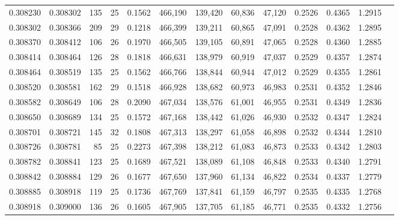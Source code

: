 \begin{tabular}{rrrrrrrrrrrrr}
0.308230 & 0.308302 &   135 &  25 &                                     0.1562 & 466,190 & 139,420 &  60,836 &  47,120 & 0.2526 & 0.4365 & 1.2915 \\
0.308302 & 0.308366 &   209 &  29 &                                     0.1218 & 466,399 & 139,211 &  60,865 &  47,091 & 0.2528 & 0.4362 & 1.2895 \\
0.308370 & 0.308412 &   106 &  26 &                                     0.1970 & 466,505 & 139,105 &  60,891 &  47,065 & 0.2528 & 0.4360 & 1.2885 \\
0.308414 & 0.308464 &   126 &  28 &                                     0.1818 & 466,631 & 138,979 &  60,919 &  47,037 & 0.2529 & 0.4357 & 1.2874 \\
0.308464 & 0.308519 &   135 &  25 &                                     0.1562 & 466,766 & 138,844 &  60,944 &  47,012 & 0.2529 & 0.4355 & 1.2861 \\
0.308520 & 0.308581 &   162 &  29 &                                     0.1518 & 466,928 & 138,682 &  60,973 &  46,983 & 0.2531 & 0.4352 & 1.2846 \\
0.308582 & 0.308649 &   106 &  28 &                                     0.2090 & 467,034 & 138,576 &  61,001 &  46,955 & 0.2531 & 0.4349 & 1.2836 \\
0.308650 & 0.308689 &   134 &  25 &                                     0.1572 & 467,168 & 138,442 &  61,026 &  46,930 & 0.2532 & 0.4347 & 1.2824 \\
0.308701 & 0.308721 &   145 &  32 &                                     0.1808 & 467,313 & 138,297 &  61,058 &  46,898 & 0.2532 & 0.4344 & 1.2810 \\
0.308726 & 0.308781 &    85 &  25 &                                     0.2273 & 467,398 & 138,212 &  61,083 &  46,873 & 0.2533 & 0.4342 & 1.2803 \\
0.308782 & 0.308841 &   123 &  25 &                                     0.1689 & 467,521 & 138,089 &  61,108 &  46,848 & 0.2533 & 0.4340 & 1.2791 \\
0.308842 & 0.308884 &   129 &  26 &                                     0.1677 & 467,650 & 137,960 &  61,134 &  46,822 & 0.2534 & 0.4337 & 1.2779 \\
0.308885 & 0.308918 &   119 &  25 &                                     0.1736 & 467,769 & 137,841 &  61,159 &  46,797 & 0.2535 & 0.4335 & 1.2768 \\
0.308918 & 0.309000 &   136 &  26 &                                     0.1605 & 467,905 & 137,705 &  61,185 &  46,771 & 0.2535 & 0.4332 & 1.2756 \\

\end{tabular}
